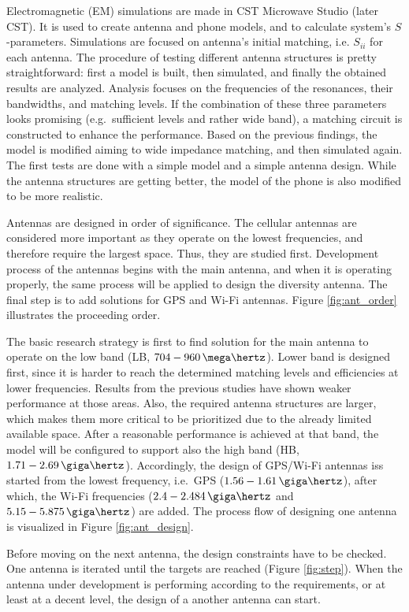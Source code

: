 Electromagnetic (EM) simulations are made in CST Microwave Studio \cite{cst} (later CST). It is used to create antenna and phone models, and to calculate system's $S$-parameters. Simulations are focused on antenna's initial matching, i.e. $S_{ii}$ for each antenna. The procedure of testing different antenna structures is pretty straightforward: first a model is built, then simulated, and finally the obtained results are analyzed. Analysis focuses on the frequencies of the resonances, their bandwidths, and matching levels. If the combination of these three parameters looks promising (e.g.\ sufficient levels and rather wide band), a matching circuit is constructed to enhance the performance. Based on the previous findings, the model is modified aiming to wide impedance matching, and then simulated again. The first tests are done with a simple model and a simple antenna design. While the antenna structures are getting better, the model of the phone is also modified to be more realistic.

Antennas are designed in order of significance. The cellular antennas are considered more important as they operate on the lowest frequencies, and therefore require the largest space. Thus, they are studied first. Development process of the antennas begins with the main antenna, and when it is operating properly, the same process will be applied to design the diversity antenna. The final step is to add solutions for GPS and Wi-Fi antennas. Figure \ref{fig:ant_order} illustrates the proceeding order. 

The basic research strategy is first to find solution for the main antenna to operate on the low band (LB, $704-960\,\mega\hertz$). Lower band is designed first, since it is harder to reach the determined matching levels and efficiencies at lower frequencies. Results from the previous studies have shown weaker performance at those areas. Also, the required antenna structures are larger, which makes them more critical to be prioritized due to the already limited available space. After a reasonable performance is achieved at that band, the model will be configured to support also the high band (HB, $1.71-2.69\,\giga\hertz$). Accordingly, the design of GPS/Wi-Fi antennas iss started from the lowest frequency, i.e.\ GPS ($1.56-1.61\,\giga\hertz$), after which, the Wi-Fi frequencies ($2.4-2.484\,\giga\hertz$ and $5.15-5.875\,\giga\hertz$) are added. The process flow of designing one antenna is visualized in Figure \ref{fig:ant_design}.

Before moving on the next antenna, the design constraints have to be checked. One antenna is iterated until the targets are reached (Figure \ref{fig:step}). When the antenna under development is performing according to the requirements, or at least at a decent level, the design of a another antenna can start.

